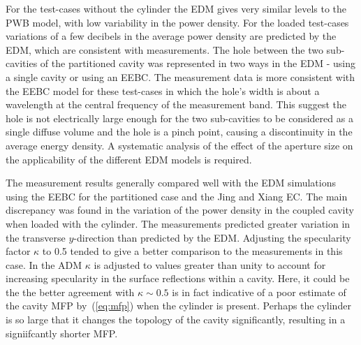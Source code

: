 \documentclass[a4paper]{article}
\numberwithin{equation}{section}
\begin{document}
For the test-cases without the cylinder the EDM gives very similar levels to the PWB model, with low
variability in the power density. For the loaded test-cases variations of a few decibels in the average
power density are predicted by the EDM, which are consistent with measurements. The hole between the
two sub-cavities of the partitioned cavity was represented in two ways in the EDM - using a single 
cavity or using an EEBC. The measurement data is more consistent with the EEBC model for these
test-cases in which the hole's width is about a wavelength at the central frequency of the measurement
band. This suggest the hole is not electrically large enough for the two sub-cavities to be considered
as a single diffuse volume and the hole is a pinch point, causing a discontinuity in the average 
energy density. A systematic analysis of the effect of the aperture size on the applicability of the
different EDM models is required.

The measurement results generally compared well with the EDM simulations using the EEBC for the partitioned
case and the Jing and Xiang EC. The main discrepancy was found in the variation of the power density in the
coupled cavity when loaded with the cylinder. The measurements predicted greater variation in the transverse
$y$-direction than predicted by the EDM. Adjusting the specularity factor $\kappa$ to 0.5 tended to give a
better comparison to the measurements in this case. In the ADM $\kappa$ is adjusted to values greater than
unity to account for increasing specularity in the surface reflections within a cavity. Here, it could be 
the the better agreement with $\kappa\sim 0.5$ is in fact indicative of a poor estimate of the cavity
MFP by~(\ref{eq:mfp}) when the cylinder is present. Perhaps the cylinder is so large that it changes the
topology of the cavity significantly, resulting in a signiifcantly shorter MFP.


%

\end{document}
